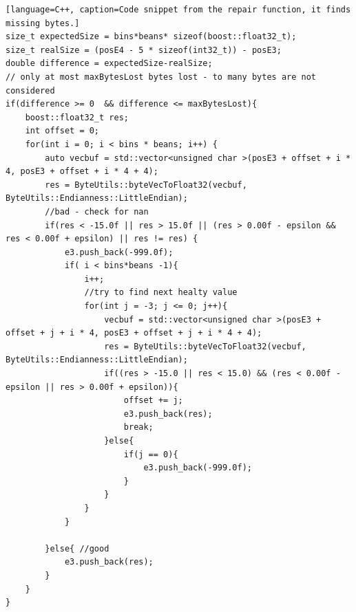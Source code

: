 \begin{lstlisting}[language=C++, caption=Code snippet from the repair function, it finds missing bytes.]
size_t expectedSize = bins*beans* sizeof(boost::float32_t);
size_t realSize = (posE4 - 5 * sizeof(int32_t)) - posE3;
double difference = expectedSize-realSize;
// only at most maxBytesLost bytes lost - to many bytes are not considered
if(difference >= 0  && difference <= maxBytesLost){
    boost::float32_t res;
    int offset = 0;
    for(int i = 0; i < bins * beans; i++) {
        auto vecbuf = std::vector<unsigned char >(posE3 + offset + i * 4, posE3 + offset + i * 4 + 4);
        res = ByteUtils::byteVecToFloat32(vecbuf, ByteUtils::Endianness::LittleEndian);
        //bad - check for nan
        if(res < -15.0f || res > 15.0f || (res > 0.00f - epsilon && res < 0.00f + epsilon) || res != res) {
            e3.push_back(-999.0f);
            if( i < bins*beans -1){
                i++;
                //try to find next healty value
                for(int j = -3; j <= 0; j++){
                    vecbuf = std::vector<unsigned char >(posE3 + offset + j + i * 4, posE3 + offset + j + i * 4 + 4);
                    res = ByteUtils::byteVecToFloat32(vecbuf, ByteUtils::Endianness::LittleEndian);
                    if((res > -15.0 || res < 15.0) && (res < 0.00f - epsilon || res > 0.00f + epsilon)){
                        offset += j;
                        e3.push_back(res);
                        break;
                    }else{
                        if(j == 0){
                            e3.push_back(-999.0f);
                        }
                    }
                }
            }

        }else{ //good
            e3.push_back(res);
        }
    }
}
\end{lstlisting}

\pagebreak

